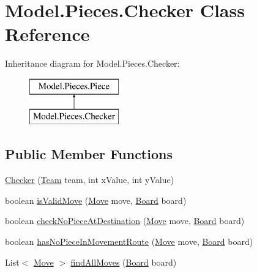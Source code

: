\hypertarget{class_model_1_1_pieces_1_1_checker}{}\section{Model.\+Pieces.\+Checker Class Reference}
\label{class_model_1_1_pieces_1_1_checker}
Inheritance diagram for Model.\+Pieces.\+Checker\+:\begin{figure}[H]
\begin{center}
\leavevmode
\includegraphics[height=2.000000cm]{class_model_1_1_pieces_1_1_checker}
\end{center}
\end{figure}
\subsection*{Public Member Functions}
\begin{DoxyCompactItemize}
\item 
\hyperlink{class_model_1_1_pieces_1_1_checker_af2b456d3e6c3ceff5a641fac1928fd5a}{Checker} (\hyperlink{class_model_1_1_team}{Team} team, int x\+Value, int y\+Value)
\item 
boolean \hyperlink{class_model_1_1_pieces_1_1_checker_a833ad4dc58dc068f194b30c5eb989d52}{is\+Valid\+Move} (\hyperlink{class_model_1_1_move}{Move} move, \hyperlink{class_model_1_1_board}{Board} board)
\item 
boolean \hyperlink{class_model_1_1_pieces_1_1_checker_ada084337407a5dc86bee162d61de44a8}{check\+No\+Piece\+At\+Destination} (\hyperlink{class_model_1_1_move}{Move} move, \hyperlink{class_model_1_1_board}{Board} board)
\item 
boolean \hyperlink{class_model_1_1_pieces_1_1_checker_a493190714612bdc8125c475b41434c75}{has\+No\+Piece\+In\+Movement\+Route} (\hyperlink{class_model_1_1_move}{Move} move, \hyperlink{class_model_1_1_board}{Board} board)
\item 
List$<$ \hyperlink{class_model_1_1_move}{Move} $>$ \hyperlink{class_model_1_1_pieces_1_1_checker_a840159766272906e7d72551c92623eee}{find\+All\+Moves} (\hyperlink{class_model_1_1_board}{Board} board)
\end{DoxyCompactItemize}


